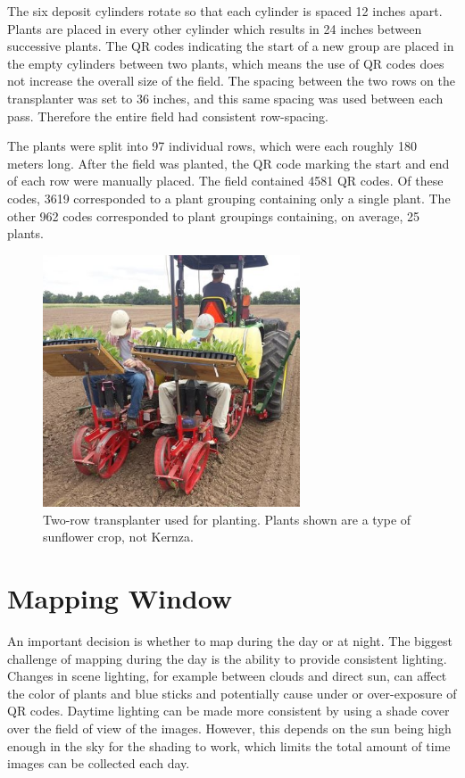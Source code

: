 The six deposit cylinders rotate so that each cylinder is spaced 12 inches apart.  Plants are placed in every other cylinder which results in 24 inches between successive plants.  The QR codes indicating the start of a new group are placed in the empty cylinders between two plants, which means the use of QR codes does not increase the overall size of the field. The spacing between the two rows on the transplanter was set to 36 inches, and this same spacing was used between each pass.  Therefore the entire field had consistent row-spacing. 

The plants were split into 97 individual rows, which were each roughly 180 meters long.  After the field was planted, the QR code marking the start and end of each row were manually placed.  The field contained 4581 QR codes.  Of these codes, 3619 corresponded to a plant grouping containing only a single plant.  The other 962 codes corresponded to plant groupings containing, on average, 25 plants.  

\begin{figure}[htb]
	\centering
    \includegraphics[width=3in]{figures/transplanter.jpg}
    \caption[Transplanter]{Two-row transplanter used for planting. Plants shown are a type of sunflower crop, not Kernza.}
    \label{figure:transplanter}
\end{figure}  

\section{Mapping Window}

An important decision is whether to map during the day or at night.  The biggest challenge of mapping during the day is the ability to provide consistent lighting.  Changes in scene lighting, for example between clouds and direct sun, can affect the color of plants and blue sticks and potentially cause under or over-exposure of QR codes.  Daytime lighting can be made more consistent by using a shade cover over the field of view of the images.  However, this depends on the sun being high enough in the sky for the shading to work, which limits the total amount of time images can be collected each day.  

